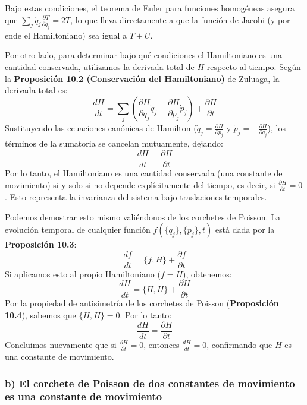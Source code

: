 \documentclass[a4paper]{article}
\begin{document}
Bajo estas condiciones, el teorema de Euler para funciones homogéneas asegura que $\sum_j \dot{q}_j \frac{\partial T}{\partial \dot{q}_j} = 2T$, lo que lleva directamente a que la función de Jacobi (y por ende el Hamiltoniano) sea igual a $T + U$.

Por otro lado, para determinar bajo qué condiciones el Hamiltoniano es una cantidad conservada, utilizamos la derivada total de $H$ respecto al tiempo. Según la \textbf{Proposición 10.2 (Conservación del Hamiltoniano)} de Zuluaga, la derivada total es:
$$\frac{dH}{dt} = \sum_j \left( \frac{\partial H}{\partial q_j} \dot{q}_j + \frac{\partial H}{\partial p_j} \dot{p}_j \right) + \frac{\partial H}{\partial t}$$
Sustituyendo las ecuaciones canónicas de Hamilton ($\dot{q}_j = \frac{\partial H}{\partial p_j}$ y $\dot{p}_j = -\frac{\partial H}{\partial q_j}$), los términos de la sumatoria se cancelan mutuamente, dejando:
$$\frac{dH}{dt} = \frac{\partial H}{\partial t}$$
Por lo tanto, el Hamiltoniano es una cantidad conservada (una constante de movimiento) si y solo si no depende explícitamente del tiempo, es decir, si $\frac{\partial H}{\partial t} = 0$. Esto representa la invarianza del sistema bajo traslaciones temporales.

Podemos demostrar esto mismo valiéndonos de los corchetes de Poisson. La evolución temporal de cualquier función $f(\{q_j\}, \{p_j\}, t)$ está dada por la \textbf{Proposición 10.3}:
$$\frac{df}{dt} = \{f, H\} + \frac{\partial f}{\partial t}$$
Si aplicamos esto al propio Hamiltoniano ($f = H$), obtenemos:
$$\frac{dH}{dt} = \{H, H\} + \frac{\partial H}{\partial t}$$
Por la propiedad de antisimetría de los corchetes de Poisson (\textbf{Proposición 10.4}), sabemos que $\{H, H\} = 0$. Por lo tanto:
$$\frac{dH}{dt} = \frac{\partial H}{\partial t}$$
Concluimos nuevamente que si $\frac{\partial H}{\partial t} = 0$, entonces $\frac{dH}{dt} = 0$, confirmando que $H$ es una constante de movimiento.

\subsubsection*{b) El corchete de Poisson de dos constantes de movimiento es una constante de movimiento}
\end{document}
